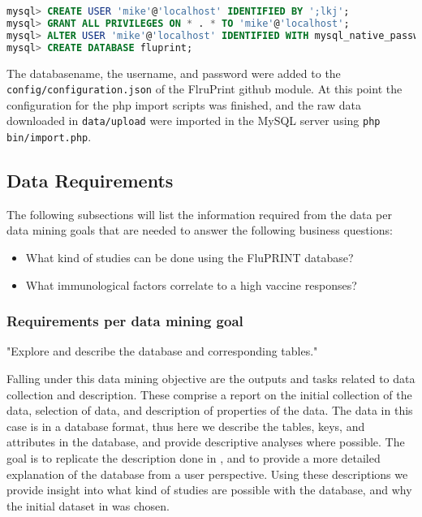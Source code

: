 \begin{lstlisting}[language=sql, caption=Adding user and database to sql server, label={lst:addUser}]
mysql> CREATE USER 'mike'@'localhost' IDENTIFIED BY ';lkj';
mysql> GRANT ALL PRIVILEGES ON * . * TO 'mike'@'localhost';
mysql> ALTER USER 'mike'@'localhost' IDENTIFIED WITH mysql_native_password BY 'mike';
mysql> CREATE DATABASE fluprint;
\end{lstlisting}

The databasename, the username, and password were added to the
\lstinline{config/configuration.json} of the FlruPrint github module. At this
point the configuration for the php import scripts was finished, and the raw
data downloaded in \lstinline{data/upload} were imported in the MySQL server
using \lstinline{php bin/import.php}.

\subsection{Data Requirements}

The following subsections will list the information required from the data per
data mining goals that are needed to answer the following business questions:

\begin{itemize}
        \item What kind of studies can be done using the FluPRINT database?
        \item What immunological factors correlate to a high vaccine responses?
\end{itemize}

\subsubsection{Requirements per data mining goal}

\begin{displayquote}
"Explore and describe the database and corresponding tables."
\end{displayquote}

Falling under this data mining objective are the outputs and tasks related to
data collection and description. These comprise a report on the initial
collection of the data, selection of data, and description of properties of the
data. The data in this case is in a database format, thus here we describe the
tables, keys, and attributes in the database, and provide descriptive analyses
where possible. The goal is to replicate the description done in
\cite{tomicFluPRINTDatasetMultidimensional2019}, and to provide a more detailed
explanation of the database from a user perspective.  Using these descriptions
we provide insight into what kind of studies are possible with the database,
and why the initial dataset in \cite{tomicSIMONAutomatedMachine2019} was chosen.

